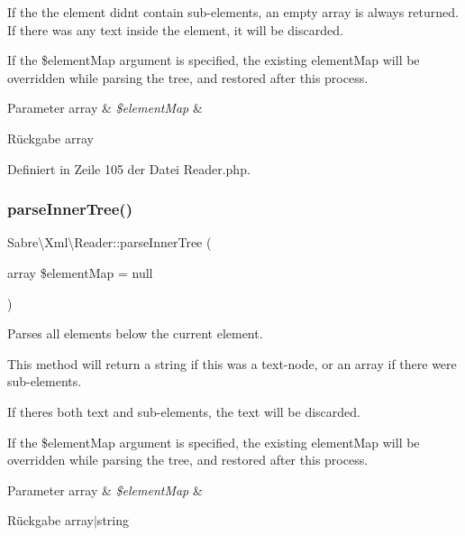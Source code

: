 If the the element didn\textquotesingle{}t contain sub-\/elements, an empty array is always returned. If there was any text inside the element, it will be discarded.

If the \$element\+Map argument is specified, the existing element\+Map will be overridden while parsing the tree, and restored after this process.


\begin{DoxyParams}[1]{Parameter}
array & {\em \$element\+Map} & \\
\hline
\end{DoxyParams}
\begin{DoxyReturn}{Rückgabe}
array 
\end{DoxyReturn}


Definiert in Zeile 105 der Datei Reader.\+php.

\mbox{\label{class_sabre_1_1_xml_1_1_reader_a6621ccff3f12f0fd262de08e948fd2bb}} 
\subsubsection{\texorpdfstring{parse\+Inner\+Tree()}{parseInnerTree()}}
{\footnotesize\ttfamily Sabre\textbackslash{}\+Xml\textbackslash{}\+Reader\+::parse\+Inner\+Tree (\begin{DoxyParamCaption}\item[{array}]{\$element\+Map = {\ttfamily null} }\end{DoxyParamCaption})}

Parses all elements below the current element.

This method will return a string if this was a text-\/node, or an array if there were sub-\/elements.

If there\textquotesingle{}s both text and sub-\/elements, the text will be discarded.

If the \$element\+Map argument is specified, the existing element\+Map will be overridden while parsing the tree, and restored after this process.


\begin{DoxyParams}[1]{Parameter}
array & {\em \$element\+Map} & \\
\hline
\end{DoxyParams}
\begin{DoxyReturn}{Rückgabe}
array$\vert$string 
\end{DoxyReturn}



